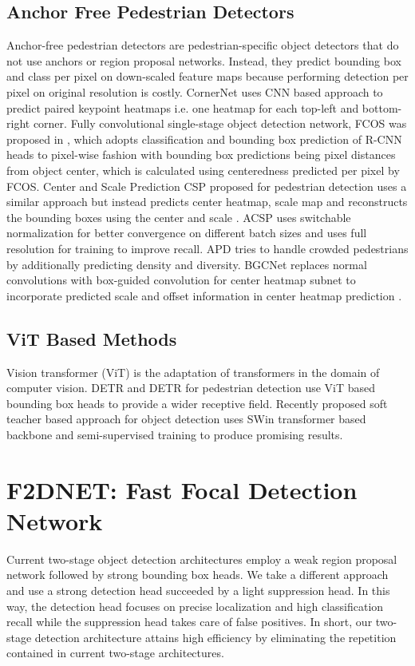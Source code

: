 \documentclass[a4paper,conference]{IEEEtran}
\begin{document}
\subsection{Anchor Free Pedestrian Detectors}
Anchor-free pedestrian detectors are pedestrian-specific object detectors that do not use anchors or region proposal networks. Instead, they predict bounding box and class per pixel on down-scaled feature maps because performing detection per pixel on original resolution is costly. CornerNet \cite{cornernet} uses CNN based approach to predict paired keypoint heatmaps i.e. one heatmap for each top-left and bottom-right corner. Fully convolutional single-stage object detection network, FCOS was proposed in \cite{fcos}, which adopts classification and bounding box prediction of R-CNN heads to pixel-wise fashion with bounding box predictions being pixel distances from object center, which is calculated using centeredness predicted per pixel by FCOS. Center and Scale Prediction CSP \cite{csp} proposed for pedestrian detection uses a similar approach but instead predicts center heatmap, scale map and reconstructs the bounding boxes using the center and scale \cite{csp}. ACSP \cite{acsp} uses switchable normalization for better convergence on different batch sizes and
uses full resolution for training to improve recall. APD \cite{apd} tries to handle crowded pedestrians by additionally predicting density and diversity. BGCNet replaces normal convolutions with box-guided convolution for center heatmap subnet to incorporate predicted scale and offset information in center heatmap prediction \cite{bgcnet}. 

\subsection{ViT Based Methods}
Vision transformer (ViT) is the adaptation of transformers in the domain of computer vision. DETR \cite{detr} and DETR for pedestrian detection \cite{ped_detr} use ViT based bounding box heads to provide a wider receptive field. Recently proposed soft teacher based approach for object detection \cite{softteacher} uses SWin transformer \cite{swint} based backbone and semi-supervised training to produce promising results.
 
\section{F2DNET: Fast Focal Detection Network}
Current two-stage object detection architectures employ a weak region proposal network followed by strong bounding box heads. We take a different approach and use a strong detection head succeeded by a light suppression head. In this way, the detection head focuses on precise localization and high classification recall while the suppression head takes care of false positives. In short, our two-stage detection architecture attains high efficiency by eliminating the repetition contained in current two-stage architectures.
\end{document}
